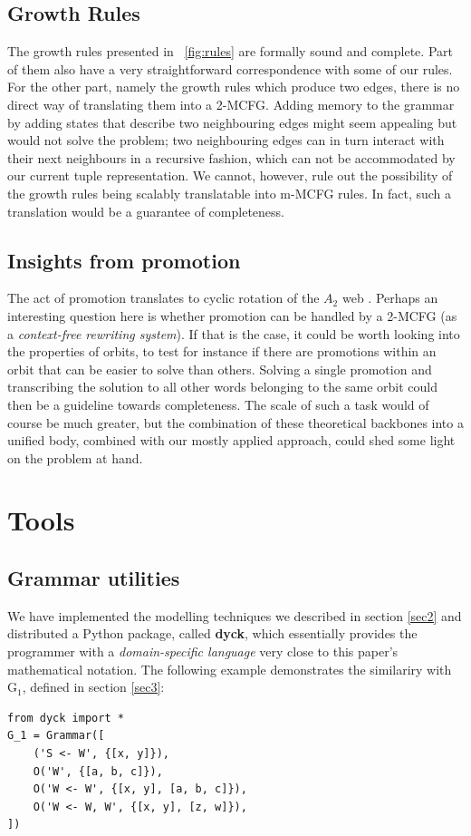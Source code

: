 \documentclass[nonatbib,numbers,10pt]{sigplanconf}
\begin{document}
\subsection{Growth Rules}
The growth rules presented in ~\ref{fig:rules} are formally sound and complete. Part of them also have a very straightforward correspondence with some of our rules. For the other part, namely the growth rules which produce two edges, there is no direct way of translating them into a 2-MCFG. Adding memory to the grammar by adding states that describe two neighbouring edges might seem appealing but would not solve the problem; two neighbouring edges can in turn interact with their next neighbours in a recursive fashion, which can not be accommodated by our current tuple representation. We cannot, however, rule out the possibility of the growth rules being scalably translatable into m-MCFG rules. In fact, such a translation would be a guarantee of completeness.
\subsection{Insights from promotion}
The act of promotion translates to cyclic rotation of the $A_2$ web \cite{petersen}. Perhaps an interesting question here is whether promotion can be handled by a 2-MCFG (as a \textit{context-free rewriting system}). If that is the case, it could be worth looking into the properties of orbits, to test for instance if there are promotions within an orbit that can be easier to solve than others. Solving a single promotion and transcribing the solution to all other words belonging to the same orbit could then be a guideline towards completeness. The scale of such a task would of course be much greater, but the combination of these theoretical backbones into a unified body, combined with our mostly applied approach, could shed some light on the problem at hand.

\section{Tools}\label{tools}
\subsection{Grammar utilities}
We have implemented the modelling techniques we described in section \ref{sec2} and distributed a Python package, called \textbf{dyck}, which essentially provides the programmer with a \textit{domain-specific language} very close to this paper's mathematical notation. The following example demonstrates the similariry with G$_1$, defined in section \ref{sec3}:
\begin{verbatim}
from dyck import *
G_1 = Grammar([
    ('S <- W', {[x, y]}),
    O('W', {[a, b, c]}),
    O('W <- W', {[x, y], [a, b, c]}),
    O('W <- W, W', {[x, y], [z, w]}),
])
\end{verbatim}
\end{document}
